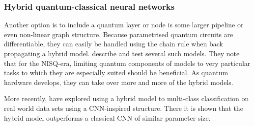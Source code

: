 \subsubsection{Hybrid quantum-classical neural networks}
Another option is to include a quantum layer or node is some larger pipeline or even non-linear graph structure.
Because parametrised quantum circuits are differentiable, they can easily be handled using the chain rule when back propagating a hybrid model.
\textcite{killoran2019} describe and test several such models.
They note that for the NISQ-era, limiting quantum components of models to very particular tasks to which they are especially suited should be beneficial.
As quantum hardware develops, they can take over more and more of the hybrid models.


More recently, \textcite{zeng2022} have explored using a hybrid model to multi-class classification on real world data sets using a CNN-inspired structure.
There it is shown that the hybrid model outperforms a classical CNN of similar parameter size.
